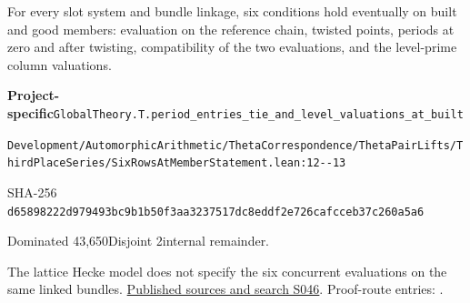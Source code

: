 
\begin{formalstatement}[D394]\label{decomp:D394}
For every slot system and bundle linkage, six conditions hold eventually on built and good members: evaluation on the reference chain, twisted points, periods at zero and after twisting, compatibility of the two evaluations, and the level-prime column valuations.
\end{formalstatement}
{\small\raggedright\noindent\textsf{\bfseries Project-specific}\quad \nolinkurl{GlobalTheory.T.period_entries_tie_and_level_valuations_at_built}\par\noindent \nolinkurl{Development/AutomorphicArithmetic/ThetaCorrespondence/ThetaPairLifts/ThirdPlaceSeries/SixRowsAtMemberStatement.lean:12--13}\par\noindent SHA-256 \nolinkurl{d65898222d979493bc9b1b50f3aa3237517dc8eddf2e726cafcceb37c260a5a6}\par\noindent Dominated 43,650\quad Disjoint 2\quad internal remainder.\par}
The lattice Hecke model does not specify the six concurrent evaluations on the same linked bundles.
\hyperref[lit:S046]{Published sources and search S046}.
Proof-route entries: .
